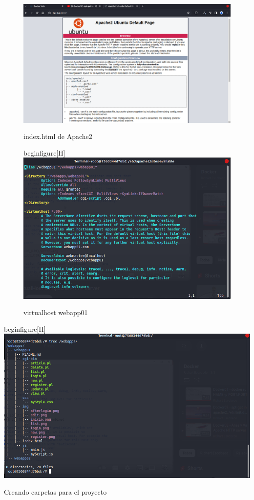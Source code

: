 \documentclass{article}
\begin{document}
\begin{itemize}
  \label{fig:imagen5}
   \begin{figure}[H]
  \centering
  \includegraphics[width=1\textwidth]{img/Pictures/indexApache2.png}
  \caption{index.html de Apache2}
  begin{figure}[H]
  \centering
  \includegraphics[width=1\textwidth]{img/Pictures/virtualhost.png}
  \caption{virtualhost webapp01}
  \label{fig:imagen6}
  \end{figure}

  
  
  begin{figure}[H]
  \centering
  \includegraphics[width=1\textwidth]{img/Pictures/treeWebapp.png}
  \caption{Creando carpetas para el proyecto}


\end{itemize}
\end{document}
